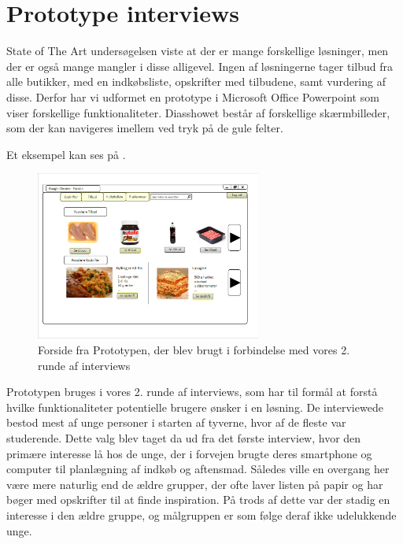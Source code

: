 \section{Prototype interviews}\label{section:interview2}
State of The Art undersøgelsen viste at der er mange forskellige løsninger, men der er også mange mangler i disse alligevel.
Ingen af løsningerne tager tilbud fra alle butikker, med en indkøbsliste, opskrifter med tilbudene, samt vurdering af disse.
Derfor har vi udformet en prototype i Microsoft Office Powerpoint som viser forskellige funktionaliteter. 
Diasshowet består af forskellige skærmbilleder, som der kan navigeres imellem ved tryk på de gule felter.

Et eksempel kan ses på .

\begin{figure}
\vspace{-20pt}
	\begin{center}
		\includegraphics[width=0.66\textwidth]{images/Images/prototype-forside.PNG}
	\end{center}
	\vspace{-20pt}
	\caption{Forside fra Prototypen, der blev brugt i forbindelse med vores 2. runde af interviews}\label{ss:Prototype}
	\vspace{-20pt}
\end{figure}

Prototypen bruges i vores 2. runde af interviews, som har til formål at forstå hvilke funktionaliteter potentielle brugere ønsker i en løsning.
De interviewede bestod mest af unge personer i starten af tyverne, hvor af de fleste var studerende.
Dette valg blev taget da ud fra det første interview, hvor den primære interesse lå hos de unge, der i forvejen brugte deres smartphone og computer til planlægning af indkøb og aftensmad.
Således ville en overgang her være mere naturlig end de ældre grupper, der ofte laver listen på papir og har bøger med opskrifter til at finde inspiration.
På trods af dette var der stadig en interesse i den ældre gruppe, og målgruppen er som følge deraf ikke udelukkende unge.

